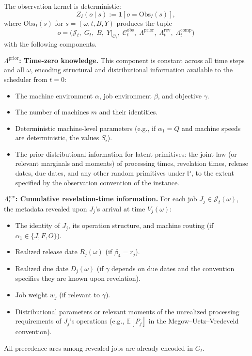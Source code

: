 The observation kernel is deterministic:
\[
Z_I(o \mid s) := \mathbf{1}[o = \mathrm{Obs}_I(s)],
\]
where $\mathrm{Obs}_I(s)$ for $s = (\omega, t, B, Y)$ produces the tuple
\[
o = \bigl(\mathcal{J}_t,\; G_t,\; B,\; Y|_{\mathcal{O}_t},\;
\mathcal{C}_t^{\mathrm{obs}},\; \Lambda^{\mathrm{prior}},\;
\Lambda_t^{\mathrm{rev}},\; \Lambda_t^{\mathrm{comp}}\bigr)
\]
with the following components.

\medskip
\noindent\textbf{$\Lambda^{\mathrm{prior}}$: Time-zero knowledge.} This component is
constant across all time steps and all $\omega$, encoding structural and distributional
information available to the scheduler from $t = 0$:
\begin{itemize}
    \item The machine environment $\alpha$, job environment $\beta$, and objective
    $\gamma$.
    \item The number of machines $m$ and their identities.
    \item Deterministic machine-level parameters (e.g., if $\alpha_1 = Q$ and machine
    speeds are deterministic, the values $S_i$).
    \item The prior distributional information for latent primitives: the joint law (or
    relevant marginals and moments) of processing times, revelation times, release
    dates, due dates, and any other random primitives under $\mathbb{P}$, to the extent
    specified by the observation convention of the instance.
\end{itemize}

\medskip
\noindent\textbf{$\Lambda_t^{\mathrm{rev}}$: Cumulative revelation-time information.}
For each job $J_j \in \mathcal{J}_t(\omega)$, the metadata revealed upon $J_j$'s arrival
at time $V_j(\omega)$:
\begin{itemize}
    \item The identity of $J_j$, its operation structure, and machine routing (if
    $\alpha_1 \in \{J, F, O\}$).
    \item Realized release date $R_j(\omega)$ (if $\beta_4 = r_j$).
    \item Realized due date $D_j(\omega)$ (if $\gamma$ depends on due dates and the
    convention specifies they are known upon revelation).
    \item Job weight $w_j$ (if relevant to $\gamma$).
    \item Distributional parameters or relevant moments of the unrealized processing
    requirements of $J_j$'s operations (e.g., $\mathbb{E}[P_j]$ in the
    Megow--Uetz--Vredeveld convention).
\end{itemize}
All precedence arcs among revealed jobs are already encoded in $G_t$.

